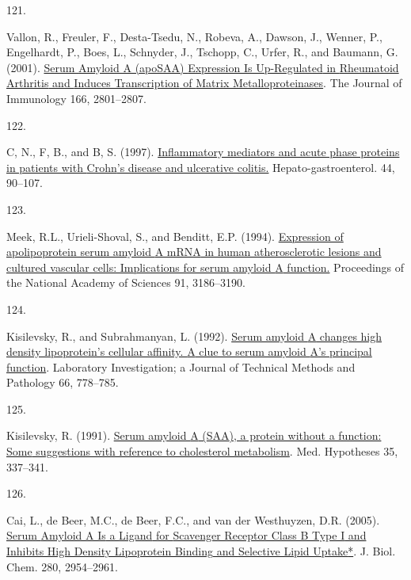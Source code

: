 \documentclass[
]{article}
\newlength{\cslhangindent}
\newlength{\csllabelwidth}
\newlength{\cslentryspacingunit} %
\newenvironment{CSLReferences}[2] %
 {%
  \setlength{\parindent}{0pt}
  \ifodd #1
  \let\oldpar\par
  \def\par{\hangindent=\cslhangindent\oldpar}
  \fi
  \setlength{\parskip}{#2\cslentryspacingunit}
 }%
 {}
\newcommand{\CSLLeftMargin}[1]{\parbox[t]{\csllabelwidth}{#1}}
\newcommand{\CSLRightInline}[1]{\parbox[t]{\linewidth - \csllabelwidth}{#1}\break}
\begin{document}
\begin{CSLReferences}{0}{0}
\leavevmode{}%
\CSLLeftMargin{121. }
\CSLRightInline{Vallon, R., Freuler, F., Desta-Tsedu, N., Robeva, A., Dawson, J., Wenner, P., Engelhardt, P., Boes, L., Schnyder, J., Tschopp, C., Urfer, R., and Baumann, G. (2001). \href{https://doi.org/10.4049/jimmunol.166.4.2801}{Serum {Amyloid A} ({apoSAA}) {Expression Is Up-Regulated} in {Rheumatoid Arthritis} and {Induces Transcription} of {Matrix Metalloproteinases}}. The Journal of Immunology 166, 2801--2807.}

\leavevmode{}%
\CSLLeftMargin{122. }
\CSLRightInline{C, N., F, B., and B, S. (1997). \href{https://www.ncbi.nlm.nih.gov/pubmed/9058126}{Inflammatory mediators and acute phase proteins in patients with {Crohn}'s disease and ulcerative colitis.} Hepato-gastroenterol. 44, 90--107.}

\leavevmode{}%
\CSLLeftMargin{123. }
\CSLRightInline{Meek, R.L., Urieli-Shoval, S., and Benditt, E.P. (1994). \href{https://doi.org/10.1073/pnas.91.8.3186}{Expression of apolipoprotein serum amyloid {A mRNA} in human atherosclerotic lesions and cultured vascular cells: Implications for serum amyloid {A} function.} Proceedings of the National Academy of Sciences 91, 3186--3190.}

\leavevmode{}%
\CSLLeftMargin{124. }
\CSLRightInline{Kisilevsky, R., and Subrahmanyan, L. (1992). \href{https://www.ncbi.nlm.nih.gov/pubmed/1602745}{Serum amyloid {A} changes high density lipoprotein's cellular affinity. {A} clue to serum amyloid {A}'s principal function}. Laboratory Investigation; a Journal of Technical Methods and Pathology 66, 778--785.}

\leavevmode{}%
\CSLLeftMargin{125. }
\CSLRightInline{Kisilevsky, R. (1991). \href{https://doi.org/10.1016/0306-9877(91)90280-C}{Serum amyloid {A} ({SAA}), a protein without a function: {Some} suggestions with reference to cholesterol metabolism}. Med. Hypotheses 35, 337--341.}

\leavevmode{}%
\CSLLeftMargin{126. }
\CSLRightInline{Cai, L., de Beer, M.C., de Beer, F.C., and van der Westhuyzen, D.R. (2005). \href{https://doi.org/10.1074/jbc.M411555200}{Serum {Amyloid A Is} a {Ligand} for {Scavenger Receptor Class B Type I} and {Inhibits High Density Lipoprotein Binding} and {Selective Lipid Uptake}*}. J. Biol. Chem. 280, 2954--2961.}


\end{CSLReferences}
\end{document}
